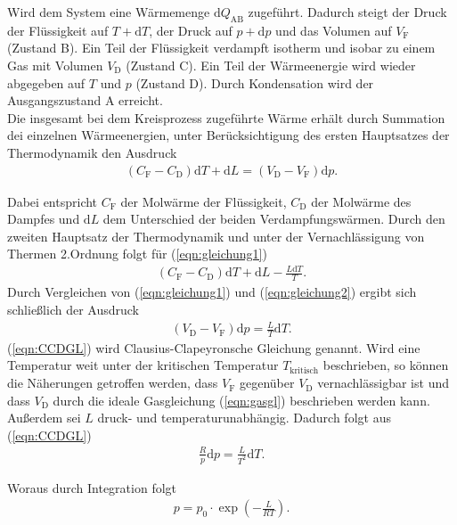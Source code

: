 \noindent
Wird dem System eine Wärmemenge $\mathrm{d}{Q_{\text{AB}}}$ zugeführt. Dadurch steigt der Druck der Flüssigkeit auf 
$T+\mathrm{d}T$, der Druck auf $p+\mathrm{d}p$ 
und das Volumen auf  $V_{\text{F}}$ (Zustand B). Ein Teil der Flüssigkeit verdampft isotherm und isobar zu einem Gas mit Volumen 
$V_{\text{D}}$ (Zustand C). Ein Teil der Wärmeenergie wird wieder abgegeben auf $T$ und $p$ (Zustand D). Durch Kondensation wird
der Ausgangszustand A erreicht.
\\

\noindent
Die insgesamt bei dem Kreisprozess zugeführte Wärme erhält durch Summation dei einzelnen Wärmeenergien, unter Berücksichtigung des 
ersten Hauptsatzes der Thermodynamik den Ausdruck 
\begin{align}
    \label{eqn:gleichung1}
    (C_{\text{F}} - C_{\text{D}}) \mathrm{d}T + \mathrm{d}L = (V_{\text{D}} - V_{\text{F}}) \mathrm{d}p.
\end{align}

\noindent
Dabei entspricht $C_{\text{F}}$ der Molwärme der Flüssigkeit, $C_{\text{D}}$ der Molwärme des Dampfes und $\mathrm{d}L$ dem Unterschied 
der beiden Verdampfungswärmen. %
Durch den zweiten Hauptsatz der Thermodynamik und unter der Vernachlässigung von Thermen 2.Ordnung folgt für (\ref{eqn:gleichung1})
\begin{align}
    (C_{\text{F}} - C_{\text{D}}) \mathrm{d}T + \mathrm{d}L - \frac{L\mathrm{d}T}{T}.
    \label{eqn:gleichung2}
\end{align}
Durch Vergleichen von (\ref{eqn:gleichung1}) und (\ref{eqn:gleichung2}) ergibt sich schließlich der Ausdruck
\begin{align}
    \label{eqn:CCDGL}
    (V_{\text{D}} - V_{\text{F}}) \mathrm{d}p = \frac{L}{T} \mathrm{d}T.
\end{align}
(\ref{eqn:CCDGL}) wird Clausius-Clapeyronsche Gleichung genannt. Wird eine Temperatur weit unter der kritischen Temperatur
$T_{\text{kritisch}}$ beschrieben, so können die Näherungen getroffen werden, dass $V_{\text{F}}$ gegenüber $V_{\text{D}}$ vernachlässigbar
ist und dass $V_{\text{D}}$ durch die ideale Gasgleichung (\ref{eqn:gasgl}) beschrieben werden kann. Außerdem sei $L$ druck- und
temperaturunabhängig. Dadurch folgt aus (\ref{eqn:CCDGL})
\begin{align*}
    \frac{R}{p}\mathrm{d}p=\frac{L}{T^2} \mathrm{d}T.
\end{align*}

\noindent
Woraus durch Integration folgt
\begin{align}
    \label{eqn:expo}
    p = p_0\cdot \exp(-\frac{L}{RT}).
\end{align}
